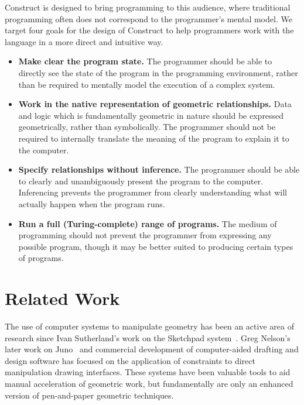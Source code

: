 \documentclass[twoside,openright,11pt]{report}
\begin{document}
Construct is designed to bring programming to this audience, where traditional programming often does not correspond to the programmer's mental model.
We target four goals for the design of Construct to help programmers work with the language in a more direct and intuitive way.

\newcommand{\constructgoalsclear}{Make clear the program state}
\newcommand{\constructgoalsnative}{Work in the native representation of geometric relationships}
\newcommand{\constructgoalsnoinfer}{Specify relationships without inference}
\newcommand{\constructgoalscomplete}{Run a full (Turing-complete) range of programs}

\begin{itemize}
  \item {\bf \constructgoalsclear.} 
        The programmer should be able to directly see the state of the program in the programming environment, rather than be required to mentally model the execution of a complex system.
  \item {\bf \constructgoalsnative.} 
        Data and logic which is fundamentally geometric in nature should be expressed geometrically, rather than symbolically. 
        The programmer should not be required to internally translate the meaning of the program to explain it to the computer.
  \item {\bf \constructgoalsnoinfer.} 
        The programmer should be able to clearly and unambiguously present the program to the computer. 
        Inferencing prevents the programmer from clearly understanding what will actually happen when the program runs.
  \item {\bf \constructgoalscomplete.} 
        The medium of programming should not prevent the programmer from expressing any possible program, though it may be better suited to producing certain types of programs.
\end{itemize}

\section{Related Work}
\label{sec:related}

The use of computer systems to manipulate geometry has been an active area of research since Ivan Sutherland's work on the Sketchpad system~\cite{sutherland1963sketchpad}. 
Greg Nelson's later work on Juno~\cite{nelson1985juno} and commercial development of computer-aided drafting and design software has focused on the application of constraints to direct manipulation drawing interfaces.
These systems have been valuable tools to aid manual acceleration of geometric work, but fundamentally are only an enhanced version of pen-and-paper geometric techniques.
\end{document}
